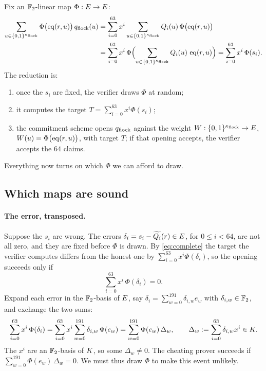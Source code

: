 Fix an $\mathbb{F}_2$-linear map $\Phi:E\to E$:
\begin{equation}
\begin{split}
\sum_{u\in\{0,1\}^{\kappa_{\mathrm{flock}}}}\Phi\bigl(\operatorname{eq}(r,u)\bigr)\,q_{\mathrm{flock}}(u)
&=\sum_{i=0}^{63}x^i\sum_{u\in\{0,1\}^{\kappa_{\mathrm{flock}}}}Q_i(u)\,\Phi\bigl(\operatorname{eq}(r,u)\bigr)\\
&=\sum_{i=0}^{63}x^i\,\Phi\Bigl(\sum_{u\in\{0,1\}^{\kappa_{\mathrm{flock}}}}Q_i(u)\,\operatorname{eq}(r,u)\Bigr)
=\sum_{i=0}^{63}x^i\,\Phi(s_i).
\end{split}
\label{eq:complete}
\end{equation}
The reduction is:
\begin{enumerate}
\item once the $s_i$ are fixed, the verifier draws $\Phi$ at random;
\item it computes the target $T=\sum_{i=0}^{63}x^i\Phi(s_i)$;
\item the commitment scheme opens $q_{\mathrm{flock}}$ against the weight $W:\{0,1\}^{\kappa_{\mathrm{flock}}}\to E$, $W(u)=\Phi\bigl(\operatorname{eq}(r,u)\bigr)$, with target $T$; if that opening accepts, the verifier accepts the $64$ claims.
\end{enumerate}
Everything now turns on which $\Phi$ we can afford to draw.

\subsection{Which maps are sound}\label{rs:sound-maps}

\paragraph{The error, transposed.} Suppose the $s_i$ are wrong. The errors $\delta_i=s_i-\widetilde{Q_i}(r)\in E$, for $0\le i<64$, are not all zero, and they are fixed before $\Phi$ is drawn. By \eqref{eq:complete} the target the verifier computes differs from the honest one by $\sum_{i=0}^{63}x^i\Phi(\delta_i)$, so the opening succeeds only if
\[
\sum_{i=0}^{63}x^i\,\Phi(\delta_i)=0.
\]
Expand each error in the $\mathbb{F}_2$-basis of $E$, say $\delta_i=\sum_{w=0}^{191}\delta_{i,w}e_w$ with $\delta_{i,w}\in\mathbb{F}_2$, and exchange the two sums:
\begin{equation}
\sum_{i=0}^{63}x^i\,\Phi(\delta_i)
=\sum_{i=0}^{63}x^i\sum_{w=0}^{191}\delta_{i,w}\,\Phi(e_w)
=\sum_{w=0}^{191}\Phi(e_w)\,\Delta_w,
\qquad
\Delta_w:=\sum_{i=0}^{63}\delta_{i,w}x^i\in K.
\label{eq:transpose}
\end{equation}
The $x^i$ are an $\mathbb{F}_2$-basis of $K$, so some $\Delta_w\neq0$. The cheating prover succeeds if $\sum_{w=0}^{191}\Phi(e_w)\,\Delta_w=0$. We must thus draw $\Phi$ to make this event unlikely.

